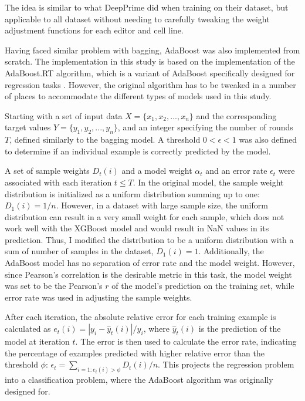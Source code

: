 The idea is similar to what DeepPrime did when training on their dataset, but applicable to all dataset without needing to carefully tweaking the weight adjustment functions for each editor and cell line.

Having faced similar problem with bagging, AdaBoost was also implemented from scratch. The implementation in this study is based on the implementation of the AdaBoost.RT algorithm, which is a variant of AdaBoost specifically designed for regression tasks \cite{shresthaExperimentsAdaBoostRT2006,solomatineAdaBoostRTBoosting2004}. However, the original algorithm has to be tweaked in a number of places to accommodate the different types of models used in this study. 

Starting with a set of input data $X=\{x_1, x_2, ..., x_n\}$ and the corresponding target values $Y=\{y_1, y_2, ..., y_n\}$, and an integer specifying the number of rounds $T$, defined similarly to the bagging model. A threshold $0<\epsilon < 1$ was also defined to determine if an individual example is correctly predicted by the model.

A set of sample weights $D_t(i)$ and a model weight $\alpha_t$ and an error rate $\epsilon_t$ were associated with each iteration $t\leq T$.
In the original model, the sample weight distribution is initialized as a uniform distribution summing up to one: $D_1(i) = 1/n$. However, in a dataset with large sample size, the uniform distribution can result in a very small weight for each sample, which does not work well with the XGBoost model and would result in NaN values in its prediction. Thus, I modified the distribution to be a uniform distribution with a sum of number of samples in the dataset, $D_1(i) = 1$. Additionally, the AdaBoost model has no separation of error rate and the model weight. However, since Pearson's correlation is the desirable metric in this task, the model weight was set to be the Pearson's $r$ of the model's prediction on the training set, while error rate was used in adjusting the sample weights.

After each iteration, the absolute relative error for each training example is calculated as $e_t(i) = |y_i - \hat{y}_t(i)|/y_i$, where $\hat{y}_t(i)$ is the prediction of the model at iteration $t$. The error is then used to calculate the error rate, indicating the percentage of examples predicted with higher relative error than the threshold $\phi$: $\epsilon_t = \sum_{i=1: e_t(i) > \phi} D_t(i) / n$. This projects the regression problem into a classification problem, where the AdaBoost algorithm was originally designed for.


